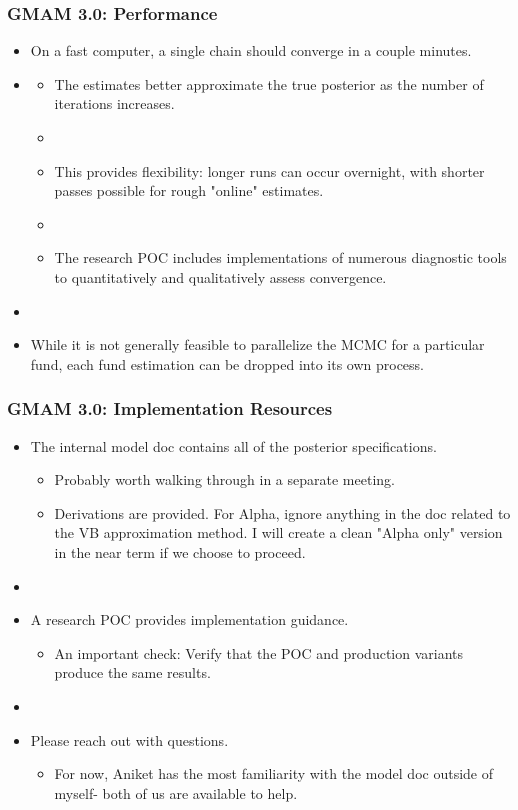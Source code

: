 \documentclass[10pt, compress]{beamer}
\begin{document}
\begin{frame}[fragile]
\frametitle{GMAM 3.0: Performance}
\begin{itemize}
    \item On a fast computer, a single chain should converge in a couple minutes.
    \item []
    \begin{itemize}
        \item The estimates better approximate the true posterior as the number of iterations increases.
        \item []
        \item This provides flexibility: longer runs can occur overnight, with shorter passes possible for rough "online" estimates.
        \item []
        \item The research POC includes implementations of numerous diagnostic tools to quantitatively and qualitatively assess convergence.
    \end{itemize}
    \item []
    \item While it is not generally feasible to parallelize the MCMC for a particular fund, each fund estimation can be dropped into its own process.
\end{itemize}
\end{frame}

\begin{frame}[fragile]
\frametitle{GMAM 3.0: Implementation Resources}
\begin{itemize}
    \item The internal model doc contains all of the posterior specifications.
    \begin{itemize}
        \item Probably worth walking through in a separate meeting.    
        \item Derivations are provided. For Alpha, ignore anything in the doc related to the VB approximation method. I will create a clean "Alpha only" version in the near term if we choose to proceed.
    \end{itemize}
    \item []
    \item A research POC provides implementation guidance.
    \begin{itemize}
        \item An important check: Verify that the POC and production variants produce the same results.
    \end{itemize}
    \item []
    \item Please reach out with questions. 
    \begin{itemize}
        \item For now, Aniket has the most familiarity with the model doc outside of myself- both of us are available to help.
    \end{itemize}
\end{itemize}
\end{frame}
\end{document}
